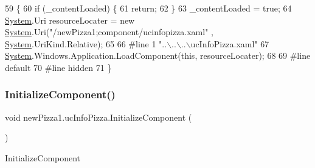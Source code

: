 \begin{DoxyCode}
59                                           \{
60             \textcolor{keywordflow}{if} (\_contentLoaded) \{
61                 \textcolor{keywordflow}{return};
62             \}
63             \_contentLoaded = \textcolor{keyword}{true};
64             \hyperlink{namespaceSystem}{System}.Uri resourceLocater = \textcolor{keyword}{new} \hyperlink{namespaceSystem}{System}.Uri(\textcolor{stringliteral}{"/newPizza1;component/ucinfopizza.xaml"}
      , \hyperlink{namespaceSystem}{System}.UriKind.Relative);
65             
66 \textcolor{preprocessor}{            #line 1 "..\(\backslash\)..\(\backslash\)..\(\backslash\)ucInfoPizza.xaml"}
67             \hyperlink{namespaceSystem}{System}.Windows.Application.LoadComponent(\textcolor{keyword}{this}, resourceLocater);
68             
69 \textcolor{preprocessor}{            #line default}
70 \textcolor{preprocessor}{            #line hidden}
71         \}
\end{DoxyCode}
\mbox{\label{classnewPizza1_1_1ucInfoPizza_a5d6e37c02a381d24941d4f45b4a21dbe}} 
\subsubsection{\texorpdfstring{Initialize\+Component()}{InitializeComponent()}\hspace{0.1cm}{\footnotesize\ttfamily [4/6]}}
{\footnotesize\ttfamily void new\+Pizza1.\+uc\+Info\+Pizza.\+Initialize\+Component (\begin{DoxyParamCaption}{ }\end{DoxyParamCaption})\hspace{0.3cm}{\ttfamily [inline]}}



Initialize\+Component 


